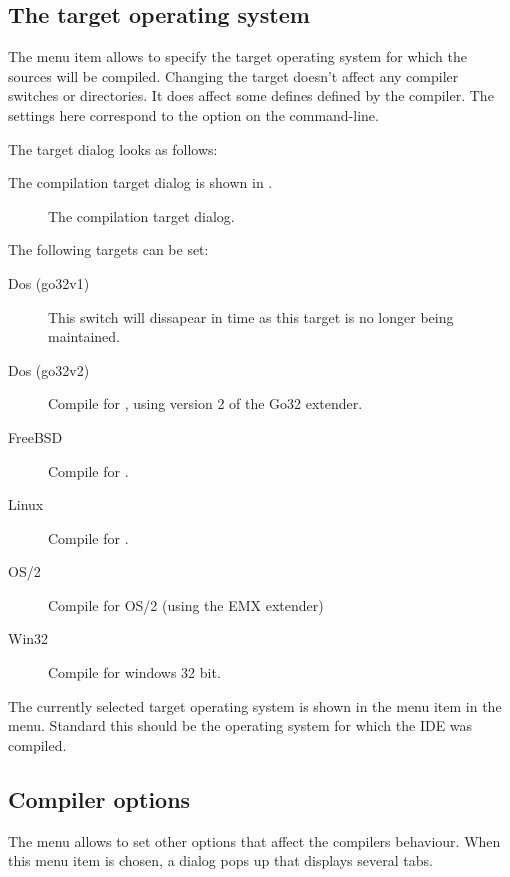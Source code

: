 \subsection{The target operating system}
The menu item  allows to specify the target
operating system for which the sources will be compiled. 
Changing the target doesn't affect any compiler switches or 
directories. It does affect some defines defined by the compiler.
The settings here correspond to the option 
on the command-line.
\begin{htmlonly}
The target dialog looks as follows:
\end{htmlonly}
\begin{latexonly}
The compilation target dialog is shown in .
\begin{figure}[ht]
\begin{center}
\caption{The compilation target dialog.}\label{fig:target}
\ifpdf
{}
\else
{}
\fi
\end{center}
\end{figure}
\end{latexonly}
The following targets can be set:
\begin{description}
\item[Dos (go32v1)] This switch will dissapear in time as this target is no
longer being maintained.
\item[Dos (go32v2)] Compile for \dos, using version 2 of the Go32 extender.
\item[FreeBSD] Compile for \freebsd.
\item[Linux] Compile for \linux.
\item[OS/2] Compile for OS/2 (using the EMX extender)
\item[Win32] Compile for windows 32 bit.
\end{description}
The currently selected target operating system is shown in the menu item in
the  menu. Standard this should be the operating system for
which the IDE was compiled.
%
%
\subsection{Compiler options}
The menu  allows to set other options that affect the
compilers behaviour. When this menu item is chosen, a dialog pops up that
displays several tabs.

